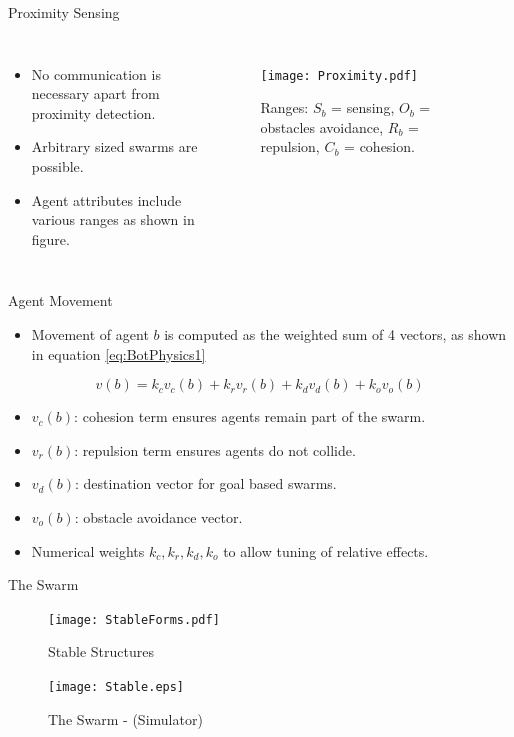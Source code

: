 \documentclass{beamer}
\begin{document}
\begin{frame}{Proximity Sensing}
  \begin{columns}
    \begin{itemize}
      \item {
        No communication is necessary apart from proximity detection.
      }
      \item {   
        Arbitrary sized swarms are possible.
      }
      \item {   
        Agent attributes include various ranges as shown in figure.
      }
    \end{itemize}
      \begin{figure}
        \begin{center}
        \texttt{[image: Proximity.pdf]}
        \end{center}
        \caption{Ranges: $S_b$ = sensing, $O_b$ = obstacles avoidance, $R_b$ = repulsion, $C_b$ = cohesion.}
      \end{figure}
  \end{columns} 
\end{frame}

\begin{frame}{Agent Movement}
  \begin{itemize}
    \item Movement of agent $b$ is computed as the weighted sum of 4 vectors, as shown in equation \ref{eq:BotPhysics1}
  \end{itemize}
  \begin{equation}\label{eq:BotPhysics1}
    v(b) = k_cv_c(b) + k_rv_r(b) + k_dv_d(b) + k_ov_o(b)
  \end{equation}
  \begin{itemize}
    \item $v_c(b)$: cohesion term ensures agents remain part of the swarm.
    \item $v_r(b)$: repulsion term ensures agents do not collide.
    \item $v_d(b)$: destination vector for goal based swarms.
    \item $v_o(b)$: obstacle avoidance vector.
    \item Numerical weights $k_c, k_r, k_d, k_o$ to allow tuning of relative effects. 
  \end{itemize}
  
\end{frame}

\begin{frame}{The Swarm}
  \begin{figure}
    \begin{center}
      \texttt{[image: StableForms.pdf]}
    \end{center}
    \caption{Stable Structures}
  \end{figure}
  \begin{figure}
    \begin{center}
      \texttt{[image: Stable.eps]}
    \end{center}
    \caption{The Swarm - (Simulator)}
  \end{figure}
\end{frame}
\end{document}
